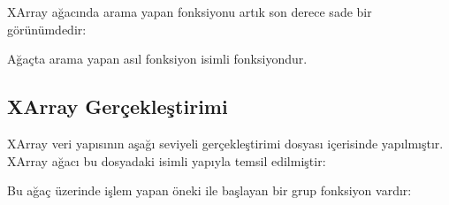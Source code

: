 \documentclass[a4paper,10pt,turkish]{sphinxmanual}
\begin{document}
\sphinxAtStartPar
XArray ağacında arama yapan  fonksiyonu artık son derece sade bir görünümdedir:

\begin{sphinxVerbatim}[commandchars=\\\{\}]
\end{sphinxVerbatim}

\sphinxAtStartPar
Ağaçta arama yapan asıl fonksiyon  isimli fonksiyondur.


\subsection{XArray Gerçekleştirimi}
\label{\detokenize{processcontrolblock:xarray-gerceklestirimi}}
\sphinxAtStartPar
XArray veri yapısının aşağı seviyeli gerçekleştirimi  dosyası içerisinde
yapılmıştır. XArray ağacı bu dosyadaki  isimli yapıyla temsil edilmiştir:

\begin{sphinxVerbatim}[commandchars=\\\{\}]
\end{sphinxVerbatim}

\sphinxAtStartPar
Bu ağaç üzerinde işlem yapan  öneki ile başlayan bir grup fonksiyon vardır:
\end{document}
